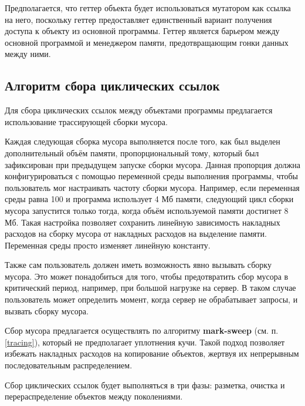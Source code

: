 Предполагается, что геттер объекта будет использоваться мутатором как ссылка на него, поскольку геттер предоставляет единственный вариант получения доступа к объекту из основной программы. Геттер является барьером между основной программой и менеджером памяти, предотвращающим гонки данных между ними.



\subsection{Алгоритм сбора циклических ссылок}

Для сбора циклических ссылок между объектами программы предлагается использование трассирующей сборки мусора.

Каждая следующая сборка мусора выполняется после того, как был выделен дополнительный объём памяти, пропорциональный тому, который был зафиксирован при предыдущем запуске сборки мусора. Данная пропорция должна конфигурироваться с помощью переменной среды выполнения программы, чтобы пользователь мог настраивать частоту сборки мусора. Например, если переменная среды равна 100 и программа использует 4 Мб памяти, следующий цикл сборки мусора запустится только тогда, когда объём используемой памяти достигнет 8 Мб. Такая настройка позволяет сохранить линейную зависимость накладных расходов на сборку мусора от накладных расходов на выделение памяти. Переменная среды просто изменяет линейную константу.

Также сам пользователь должен иметь возможность явно вызывать сборку мусора. Это может понадобиться для того, чтобы предотвратить сбор мусора в критический период, например, при большой нагрузке на сервер. В таком случае пользователь может определить момент, когда сервер не обрабатывает запросы, и вызвать сборку мусора.

Сбор мусора предлагается осуществлять по алгоритму \textbf{mark-sweep} (см. п. \ref{tracing}), который не предполагает уплотнения кучи. Такой подход позволяет избежать накладных расходов на копирование объектов, жертвуя их непрерывным последовательным распределением.

Сбор циклических ссылок будет выполняться в три фазы: разметка, очистка и перераспределение объектов между поколениями.

